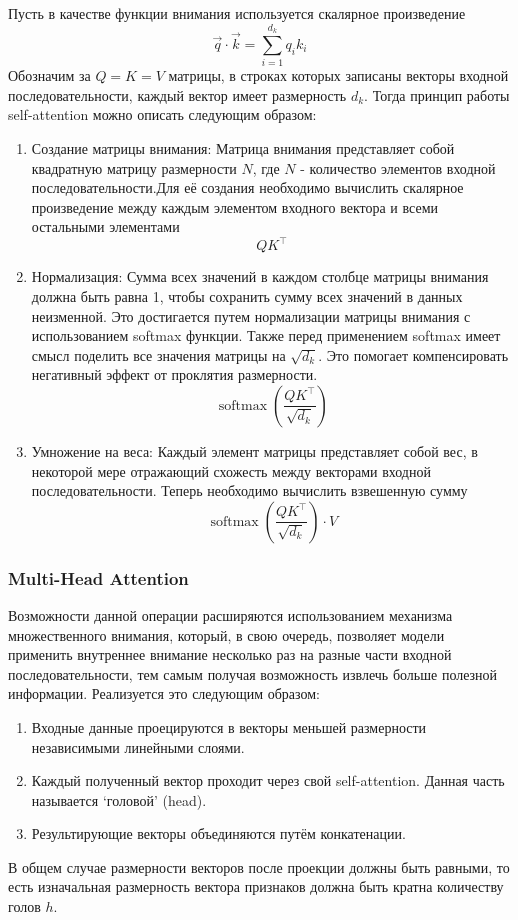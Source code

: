 \documentclass[diploma]{nanolab2015}
\DeclareMathOperator{\softmax}{softmax}
\begin{document}
Пусть в качестве функции внимания используется скалярное произведение
$$
    \vec{q} \cdot \vec{k} = \sum_{i=1}^{d_k}q_i k_i
$$
Обозначим за $Q = K = V$ матрицы, в строках которых записаны векторы входной последовательности, каждый вектор имеет размерность $d_k$.
Тогда принцип работы self-attention можно описать следующим образом:
\begin{enumerate}
    \item Создание матрицы внимания: Матрица внимания представляет собой квадратную матрицу размерности $N$, где $N$ - количество элементов входной последовательности.Для её создания необходимо вычислить скалярное произведение между каждым элементом входного вектора и всеми остальными элементами $$QK^\top$$
    \item Нормализация: Сумма всех значений в каждом столбце матрицы внимания должна быть равна 1, чтобы сохранить сумму всех значений в данных неизменной. Это достигается путем нормализации матрицы внимания с использованием softmax функции. Также перед применением softmax имеет смысл поделить все значения матрицы на $\sqrt{d_k}$. Это помогает компенсировать негативный эффект от проклятия размерности. $$\softmax(\frac{QK^\top}{\sqrt{d_k}})$$
    \item Умножение на веса: Каждый элемент матрицы представляет собой вес, в некоторой мере отражающий схожесть между векторами входной последовательности. Теперь необходимо вычислить взвешенную сумму $$\softmax(\frac{QK^\top}{\sqrt{d_k}}) \cdot V$$
\end{enumerate}

\subsubsection{Multi-Head Attention}
Возможности данной операции расширяются использованием механизма множественного внимания, который, в свою очередь, позволяет модели применить внутреннее внимание несколько раз на разные части входной последовательности, тем самым получая возможность извлечь больше полезной информации. Реализуется это следующим образом:
\begin{enumerate}
    \item Входные данные проецируются в векторы меньшей размерности независимыми линейными слоями.
    \item Каждый полученный вектор проходит через свой self-attention. Данная часть называется `головой' (head).
    \item Результирующие векторы объединяются путём конкатенации.
\end{enumerate}
В общем случае размерности векторов после проекции должны быть равными, то есть изначальная размерность вектора признаков должна быть кратна количеству голов $h$.
\end{document}
